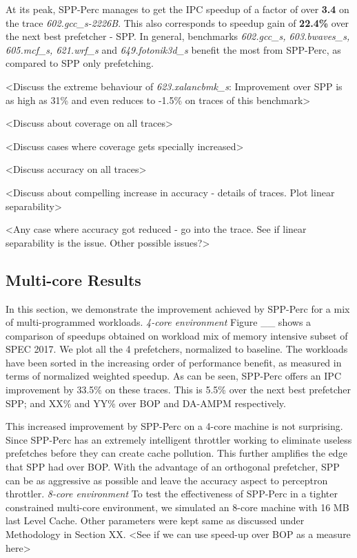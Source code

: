 \documentclass{sig-alternate}
\begin{document}
At its peak, SPP-Perc manages to get the IPC speedup of a factor of over \textbf{3.4} on the trace \textit{602.gcc\_s-2226B}. 
This also corresponds to speedup gain of \textbf{22.4\%} over the next best prefetcher - SPP. 
In general, benchmarks \textit{602.gcc\_s, 603.bwaves\_s, 605.mcf\_s, 621.wrf\_s} and \textit{649.fotonik3d\_s} benefit the most from SPP-Perc, as compared to SPP only prefetching.

<Discuss the extreme behaviour of \textit{623.xalancbmk\_s}: Improvement over SPP is as high as 31\% and even reduces to -1.5\% on traces of this benchmark>

<Discuss about coverage on all traces>

<Discuss cases where coverage gets specially increased>

<Discuss accuracy on all traces>

<Discuss about compelling increase in accuracy - details of traces. Plot linear separability>

<Any case where accuracy got reduced - go into the trace. See if linear separability is the issue. Other possible issues?>


\subsection{Multi-core Results}
In this section, we demonstrate the improvement achieved by SPP-Perc for a mix of multi-programmed workloads. 
\newline \newline
\textit{4-core environment}
Figure \_\_ shows a comparison of speedups obtained on workload mix of memory intensive subset of SPEC 2017. 
We plot all the 4 prefetchers, normalized to baseline. 
The workloads have been sorted in the increasing order of performance benefit, as measured in terms of normalized weighted speedup. 
As can be seen, SPP-Perc offers an IPC improvement by 33.5\% on these traces. 
This is 5.5\% over the next best prefetcher SPP; and XX\% and YY\% over BOP and DA-AMPM respectively.

This increased improvement by SPP-Perc on a 4-core machine is not surprising. 
Since SPP-Perc has an extremely intelligent throttler working to eliminate useless prefetches before they can create cache pollution. 
This further amplifies the edge that SPP had over BOP. 
With the advantage of an orthogonal prefetcher, SPP can be as aggressive as possible and leave the accuracy aspect to perceptron throttler.
\newline \newline
\textit{8-core environment}
To test the effectiveness of SPP-Perc in a tighter constrained multi-core environment, we simulated an 8-core machine with 16 MB last Level Cache. 
Other parameters were kept same as discussed under Methodology in Section XX.
<See if we can use speed-up over BOP as a measure here>
\end{document}
